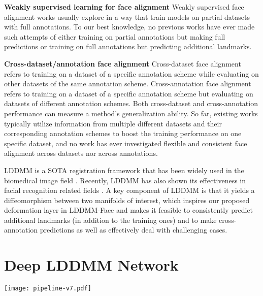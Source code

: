 \documentclass[10pt,twocolumn,letterpaper]{article}
\begin{document}
{\bf Weakly supervised learning for face alignment} 
Weakly supervised face alignment works \cite{browatzki20203fabrec, qian2019aggregation, dong2019teacher} usually explore in a way that train models on partial datasets with full annotations. To our best knowledge, no previous works have ever made such attempts of either training on partial annotations but making full predictions or training on full annotations but predicting additional landmarks.
  
{\bf Cross-dataset/annotation face alignment}
Cross-dataset face alignment refers to training on a dataset of a specific annotation scheme while evaluating on other datasets of the same annotation scheme. Cross-annotation face alignment refers to training on a dataset of a specific annotation scheme but evaluating on datasets of different annotation schemes. Both cross-dataset and cross-annotation performance can measure a method's generalization ability. So far, existing works \cite{Wu_2018_CVPR, zhu2014transferring, zhang2015leveraging} typically utilize information from multiple different datasets and their corresponding annotation schemes to boost the training performance on one specific dataset, and no work has ever investigated flexible and consistent face alignment across datasets nor across annotations. 

LDDMM is a SOTA registration framework that has been widely used in the biomedical image field \cite{miller2015amygdalar,tang2015diffeomorphometry,jiang2018deformation,yang2017analysis}. Recently, LDDMM has also shown its effectiveness in facial recognition related fields \cite{yang2018geometry}. A key component of LDDMM is that it yields a diffeomorphism between two manifolds of interest, which inspires our proposed deformation layer in LDDMM-Face and makes it feasible to consistently predict additional landmarks (in addition to the training ones) and to make cross-annotation predictions as well as effectively deal with challenging cases.

\section{Deep LDDMM Network}\label{DeepLDDMM}
\begin{figure*}[tbhp]
\begin{center}
\texttt{[image: pipeline-v7.pdf]}
\end{center}
\vspace*{-0mm}
   \caption{The overall pipeline of LDDMM-Face, which consists of a backbone model and two functional layers: a momenta estimator and a deformation layer that consists of N flows. In each flow of the deformation layer, the initial facial curve is shown in the same color as that in the mean face, and the deformed facial curve is shown in black connected diamonds. The fine blue lines connecting each initial landmark and the corresponding deformed landmark denote the trajectory of the initial landmarks. Green arrows show the predicted momenta at each time step along the trajectory.}
\label{fig:workflow}
\vspace*{-2mm}
\end{figure*}
\end{document}

